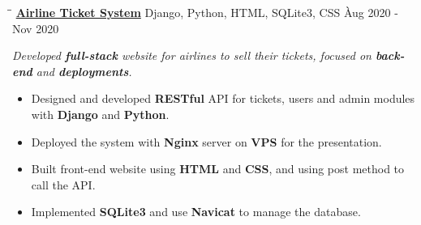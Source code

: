 \documentclass{res}
\begin{document}
\begin{resume}
    \vspace{0.00in}
    \begin{tabbing}
    \hspace{2.391in}\= \hspace{3in}\= \kill %
    \href{https://github.com/DolorHunter/AirlineTicketSystem}{\bf Airline Ticket System}  \> 
                Django, Python, HTML, SQLite3, CSS \` Aug 2020 - Nov 2020 \\
    \end{tabbing}\vspace{-20pt}      %
    \vspace{-0.1in}
    \textit{Developed {\bf full-stack} website for airlines to sell their tickets, 
                focused on {\bf back-end} and {\bf deployments}.}
    \vspace{+0.05in}
    \begin{itemize} \itemsep 1.5pt %
        \item Designed and developed {\bf RESTful} API for tickets, users and admin modules with 
                {\bf Django} and {\bf Python}.
        \item Deployed the system with {\bf Nginx} server on {\bf VPS} for the presentation.
        \item Built front-end website using {\bf HTML} and {\bf CSS}, and using post method 
                to call the API.
        \item Implemented {\bf SQLite3} and use {\bf Navicat} to manage the database.
    \end{itemize}


\end{resume}
\end{document}
